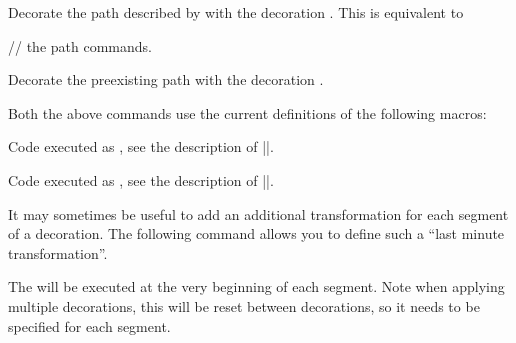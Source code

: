 \begin{command}{\pgfdecoratepath{}}
    Decorate the path described by  with the decoration
    . This is equivalent to
\begin{codeexample}
  // the path commands.
\endpgfdecoration
\end{codeexample}
\end{command}

\begin{command}{\pgfdecoratecurrentpath{}}
    Decorate the preexisting path with the decoration .
\end{command}

Both the above commands use the current definitions of the following macros:

\begin{command}{\pgfdecoratebeforecode}
    Code executed as , see the description of
    |\pgfdecoration|.
\end{command}

\begin{command}{\pgfdecorateaftercode}
    Code executed as , see the description of
    |\pgfdecoration|.
\end{command}

It may sometimes be useful to add an additional transformation for each segment
of a decoration. The following command allows you to define such a ``last
minute transformation''.

\begin{command}{\pgfsetdecorationsegmenttransformation{}}
    The  will be executed at the very beginning of each segment.
    Note when applying multiple decorations, this will be reset between
    decorations, so it needs to be specified for each segment.
\begin{codeexample}[preamble={\usetikzlibrary{decorations,decorations.pathmorphing}}]
\end{codeexample}
\end{command}


